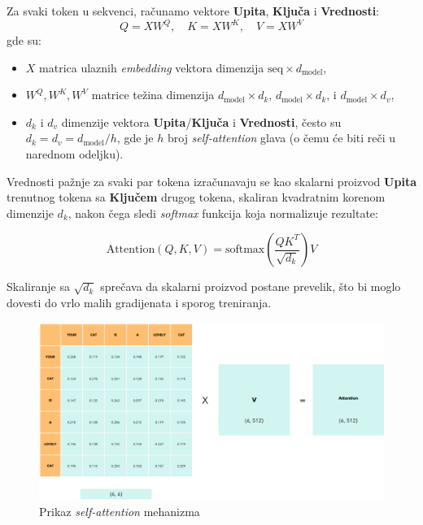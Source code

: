 \documentclass[12pt]{article}
\begin{document}
  Za svaki token u sekvenci, računamo vektore \textbf{Upita}, \textbf{Ključa} i \textbf{Vrednosti}:
   \vspace{-0.2cm} %
  \[
  Q = XW^Q, \quad K = XW^K, \quad V = XW^V
  \]
  \vspace{-0.7cm} %
  gde su:
  \begin{itemize}
   \vspace{0.2cm} %
      \item \( X \) matrica ulaznih \textit{embedding} vektora 
      dimenzija \( \text{seq} \times d_{\text{model}} \),
      \item \( W^Q, W^K, W^V \) matrice težina dimenzija 
      \( d_{\text{model}} \times d_k \), \( d_{\text{model}} \times d_k \), 
      i \( d_{\text{model}} \times d_v \),
      \item \( d_k \) i \( d_v \) dimenzije vektora \textbf{Upita}/\textbf{Ključa} i \textbf{Vrednosti}, 
      često su \\ \( d_k = d_v = d_{\text{model}}/h \), gde je \( h \) 
      broj \textit{self-attention} glava (o čemu će biti reči u narednom odeljku).
  \end{itemize}
  
  Vrednosti pažnje za svaki par tokena izračunavaju se kao skalarni proizvod 
  \textbf{Upita} trenutnog tokena sa \textbf{Ključem} drugog tokena, 
  skaliran kvadratnim korenom dimenzije \( d_k \), nakon čega sledi \textit{softmax} 
  funkcija koja normalizuje rezultate:
  
  \vspace{-0.7cm} %
  \[
  \text{Attention}(Q, K, V) = \text{softmax}\left(\frac{QK^T}{\sqrt{d_k}}\right)V
  \]
  \vspace{-0.7cm} %

  Skaliranje sa \( \sqrt{d_k} \) sprečava da skalarni proizvod postane prevelik, 
  što bi moglo dovesti do vrlo malih gradijenata i sporog treniranja.

   \begin{figure}[h!]
   \centering
   \includegraphics[width=1.1\textwidth]{self_attention.png}
   \caption{Prikaz \textit{self-attention} mehanizma \cite{transformer}}
   \label{fig:self_attention}
   \end{figure}
\end{document}
